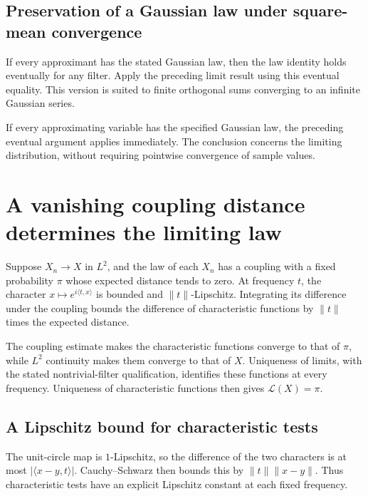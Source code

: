 \documentclass[11pt,a4paper]{article}
\begin{document}
\subsection{\texorpdfstring{Preservation of a Gaussian law under square-mean convergence}{Preservation of a Gaussian law under square-mean convergence}}


If every approximant has the stated Gaussian law, then the law identity holds eventually for any filter. Apply the preceding limit result using this eventual equality. This version is suited to finite orthogonal sums converging to an infinite Gaussian series.



If every approximating variable has the specified Gaussian law, the preceding eventual argument applies immediately. The conclusion concerns the limiting distribution, without requiring pointwise convergence of sample values.


\section{\texorpdfstring{A vanishing coupling distance determines the limiting law}{A vanishing coupling distance determines the limiting law}}


Suppose \(X_n\to X\) in \(L^2\), and the law of each \(X_n\) has a coupling with a fixed probability \(\pi\) whose expected distance tends to zero. At frequency \(t\), the character \(x\mapsto e^{i\langle t,x\rangle}\) is bounded and \(\|t\|\)-Lipschitz. Integrating its difference under the coupling bounds the difference of characteristic functions by \(\|t\|\) times the expected distance.



The coupling estimate makes the characteristic functions converge to that of \(\pi\), while \(L^2\) continuity makes them converge to that of \(X\). Uniqueness of limits, with the stated nontrivial-filter qualification, identifies these functions at every frequency. Uniqueness of characteristic functions then gives \(\mathcal L(X)=\pi\).


\subsection{\texorpdfstring{A Lipschitz bound for characteristic tests}{A Lipschitz bound for characteristic tests}}


The unit-circle map is \(1\)-Lipschitz, so the difference of the two characters is at most \(|\langle x-y,t\rangle|\). Cauchy–Schwarz then bounds this by \(\|t\|\|x-y\|\). Thus characteristic tests have an explicit Lipschitz constant at each fixed frequency.
\end{document}
